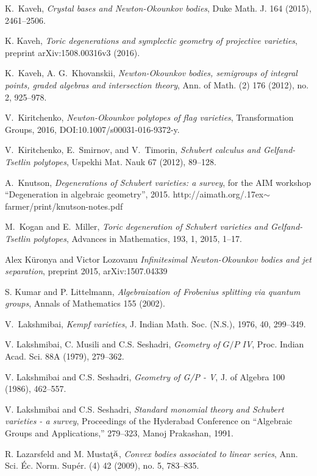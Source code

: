 \documentclass{emsprocart}
\theoremstyle{definition}
\begin{document}
\begin{thebibliography}{7}
 K.~Kaveh, {\it Crystal bases and Newton-Okounkov bodies}, Duke Math. J. 164 (2015), 2461--2506.

 K. Kaveh, \textit{Toric degenerations and symplectic geometry
of projective varieties}, preprint arXiv:1508.00316v3 (2016).

 K.~Kaveh, A. G.~Khovanskii, {\it Newton-Okounkov bodies, semigroups of integral points, graded algebras
and intersection theory}, Ann. of Math. (2) 176 (2012), no. 2, 925--978.

 V.~Kiritchenko, {\it Newton-Okounkov polytopes of flag varieties}, Transformation Groups, 2016, DOI:10.1007/s00031-016-9372-y.

 V.~Kiritchenko, E.~Smirnov, and V.~Timorin,
{\it Schubert calculus and {G}elfand-{T}setlin polytopes}, Uspekhi Mat. Nauk 67 (2012), 89--128.

 A.~Knutson, {\it Degenerations of Schubert varieties: a survey}, 
for the AIM workshop ``Degeneration in algebraic geometry'', 2015.
http://aimath.org/{\raise.17ex\hbox{$\scriptstyle\mathtt{\sim}$}}farmer/print/knutson-notes.pdf

 M.~Kogan and E.~Miller,
\textit{Toric degeneration of {S}chubert varieties and {G}elfand-{T}setlin polytopes}, Advances in Mathematics, 193, 1, 2015, 1--17.

Alex K\"uronya and Victor Lozovanu
\emph{Infinitesimal Newton-Okounkov bodies and jet separation},
preprint 2015, arXiv:1507.04339

S. Kumar and P. Littelmann,
{\it Algebraization of Frobenius splitting via quantum groups}, Annals of Mathematics 155 (2002).

V.~Lakshmibai, {\it Kempf varieties},  J. Indian Math. Soc. (N.S.), 1976, 40, 299--349.

V. Lakshmibai, C. Musili and C.S. Seshadri,
\textit{Geometry of $G/P$ IV},
Proc. Indian Acad. Sci. 88A (1979), 279--362.

V. Lakshmibai and C.S. Seshadri,
\textit{Geometry of G/P - V},
J. of Algebra 100 (1986), 462--557.

V. Lakshmibai and C.S. Seshadri,
\textit{Standard monomial theory and Schubert varieties - a survey},
Proceedings of the Hyderabad Conference on 
``Algebraic Groups and Applications,''
279--323, Manoj Prakashan, 1991.

R. Lazarsfeld and M. Musta\c{t}$\breve{\rm a}$,
\emph{Convex bodies associated to linear series},
Ann. Sci. \'Ec. Norm. Sup\'er. (4) 42 (2009), no. 5, 783--835. 


\end{thebibliography}
\end{document}
